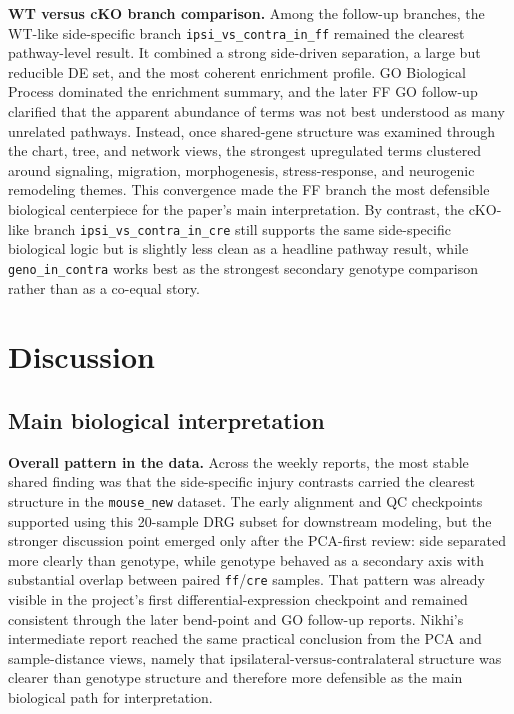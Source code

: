 \documentclass[12pt]{article}
\DeclareRobustCommand{\artifact}[1]{\texttt{#1}}
\begin{document}
\textbf{WT versus cKO branch comparison.} Among the follow-up branches, the WT-like side-specific branch \artifact{ipsi\_vs\_contra\_in\_ff} remained the clearest pathway-level result. It combined a strong side-driven separation, a large but reducible DE set, and the most coherent enrichment profile. GO Biological Process dominated the enrichment summary, and the later FF GO follow-up clarified that the apparent abundance of terms was not best understood as many unrelated pathways. Instead, once shared-gene structure was examined through the chart, tree, and network views, the strongest upregulated terms clustered around signaling, migration, morphogenesis, stress-response, and neurogenic remodeling themes. This convergence made the FF branch the most defensible biological centerpiece for the paper’s main interpretation. By contrast, the cKO-like branch \artifact{ipsi\_vs\_contra\_in\_cre} still supports the same side-specific biological logic but is slightly less clean as a headline pathway result, while \artifact{geno\_in\_contra} works best as the strongest secondary genotype comparison rather than as a co-equal story.

\section{Discussion}

\subsection{Main biological interpretation}

\textbf{Overall pattern in the data.} Across the weekly reports, the most stable shared finding was that the side-specific injury contrasts carried the clearest structure in the \artifact{mouse\_new} dataset. The early alignment and QC checkpoints supported using this 20-sample DRG subset for downstream modeling, but the stronger discussion point emerged only after the PCA-first review: side separated more clearly than genotype, while genotype behaved as a secondary axis with substantial overlap between paired \artifact{ff}/\artifact{cre} samples. That pattern was already visible in the project’s first differential-expression checkpoint and remained consistent through the later bend-point and GO follow-up reports. Nikhi’s intermediate report reached the same practical conclusion from the PCA and sample-distance views, namely that ipsilateral-versus-contralateral structure was clearer than genotype structure and therefore more defensible as the main biological path for interpretation.
\end{document}
